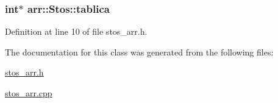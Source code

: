 \hypertarget{classarr_1_1_stos_ad8e05da5f97f966b3c4f21d661e88b05}{
\subsubsection[{tablica}]{\setlength{\rightskip}{0pt plus 5cm}int$\ast$ arr\-::\-Stos\-::tablica\hspace{0.3cm}{\ttfamily [private]}}}\label{classarr_1_1_stos_ad8e05da5f97f966b3c4f21d661e88b05}


Definition at line 10 of file stos\-\_\-arr.\-h.



The documentation for this class was generated from the following files\-:\begin{DoxyCompactItemize}
\item 
\hyperlink{stos__arr_8h}{stos\-\_\-arr.\-h}\item 
\hyperlink{stos__arr_8cpp}{stos\-\_\-arr.\-cpp}\end{DoxyCompactItemize}
